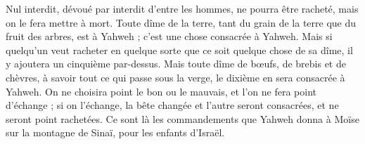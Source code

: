 \begin{multicols}{2}
Nul interdit, dévoué par interdit d'entre les hommes, ne pourra être racheté, mais on le fera mettre à mort.
Toute dîme de la terre, tant du grain de la terre que du fruit des arbres, est à Yahweh ; c'est une chose consacrée à Yahweh.
Mais si quelqu'un veut racheter en quelque sorte que ce soit quelque chose de sa dîme, il y ajoutera un cinquième par-dessus.
Mais toute dîme de bœufs, de brebis et de chèvres, à savoir tout ce qui passe sous la verge, le dixième en sera consacrée à Yahweh.
On ne choisira point le bon ou le mauvais, et l'on ne fera point d'échange ; si on l'échange, la bête changée et l'autre seront consacrées, et ne seront point rachetées.
Ce sont là les commandements que Yahweh donna à Moïse sur la montagne de Sinaï, pour les enfants d'Israël.
\PPE{}
\end{multicols}
